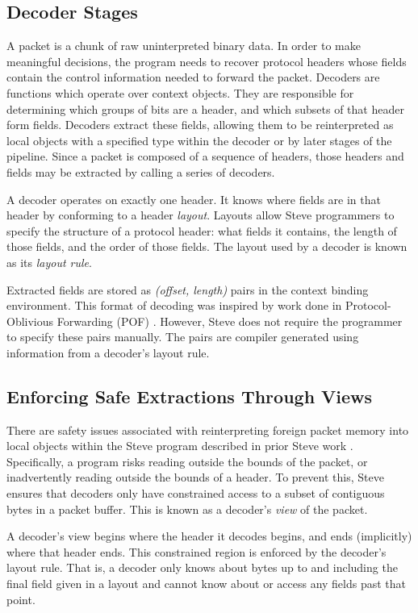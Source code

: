 \subsection{Decoder Stages} \label{decoder_desc}

A packet is a chunk of raw uninterpreted binary data.
In order to make meaningful decisions, the program needs to
recover protocol headers whose fields contain the control
information needed to forward the packet.
Decoders are functions which operate over context objects. They are responsible for determining which
groups of bits are a header, and which subsets of that header form fields. 
Decoders extract these fields, allowing them to be reinterpreted as local objects with a specified type within the decoder or by later stages of the pipeline.
Since a packet is composed of a sequence of headers, those headers and fields
may be extracted by calling a series of decoders.

A decoder operates on exactly one header.
It knows where fields are in that header by conforming to a header \emph{layout}.
Layouts allow Steve programmers to specify the structure of a
protocol header: what fields it contains, the length of those
fields, and the order of those fields.
The layout used by a decoder is known as its \emph{layout rule}.

Extracted fields are stored as \emph{(offset, length)} pairs in
the context binding environment. 
This format of decoding was inspired by work done in Protocol-Oblivious Forwarding 
(POF) \cite{pof, pof_fis, pof_impl}.
However, Steve does not require the programmer to specify these pairs manually.
The pairs are compiler generated using information from a
decoder's layout rule.

\subsection{Enforcing Safe Extractions Through Views} \label{guide:decoder_view}

There are safety issues associated with reinterpreting foreign packet memory
into local objects within the Steve program described in prior Steve work \cite{wripe}. Specifically, a program risks
reading outside the bounds of the packet, or inadvertently reading outside
the bounds of a header.
To prevent this,
Steve ensures that decoders only have constrained
access to a subset of contiguous bytes in a packet buffer.
This is known as a decoder's \emph{view} of the packet.

A decoder's view begins where the header it decodes begins, and ends
(implicitly) where that header ends. 
This constrained region is enforced by the decoder's layout rule. 
That is, a decoder only knows about bytes up to and including the final field given in a layout and cannot know about or access any fields past that point.

